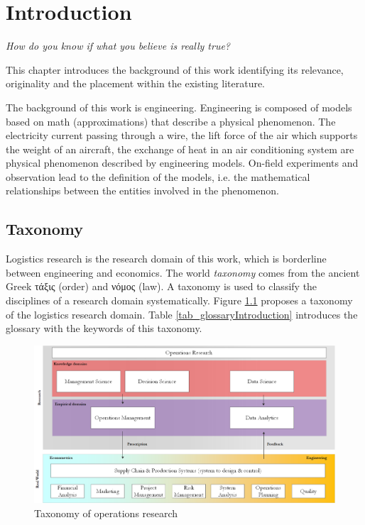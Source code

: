 \chapter{Introduction}

\epigraph{\textit{How do you know if what you believe is really true?}}{}


This chapter introduces the background of this work identifying its relevance, originality and the placement within the existing literature.\par

The background of this work is engineering. Engineering is composed of models based on math (approximations) that describe a physical phenomenon. The electricity current passing through a wire, the lift force of the air which supports the weight of an aircraft, the exchange of heat in an air conditioning system are physical phenomenon described by engineering models. On-field experiments and observation lead to the definition of the models, i.e. the mathematical relationships between the entities involved in the phenomenon.

\section{Taxonomy} \label{secSupplyChainTaxonomy}

Logistics research is the research domain of this work, which is borderline between engineering and economics. The world \textit{taxonomy} comes from the ancient Greek \textgreek{τάξις} (order) and \textgreek{νόμος} (law). A taxonomy is used to classify the disciplines of a research domain systematically. Figure \ref{fig_operationsResearch} proposes a taxonomy of the logistics research domain. Table \ref{tab_glossaryIntroduction} introduces the glossary with the keywords of this taxonomy.

\begin{figure}[hbt!]
\centering
\includegraphics[width=1\textwidth]{SectionIntroduction/introduction_figures/fig_operationsResearch.png}
\captionsetup{type=figure}
\caption{Taxonomy of operations research}
\label{fig_operationsResearch}
\end{figure}



